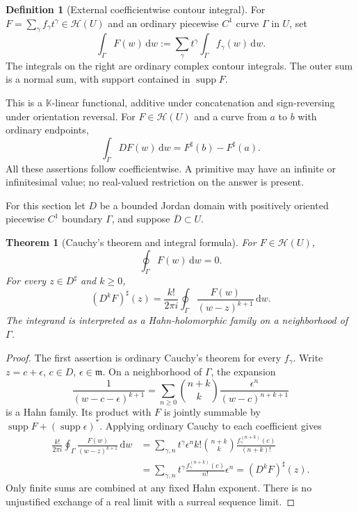 \documentclass[11pt,letterpaper]{article}
\numberwithin{equation}{section}
\newtheorem{theorem}{Theorem}[section]
\theoremstyle{definition}
\newtheorem{definition}[definition]{Definition}
\theoremstyle{remark}
\newcommand{\K}{\mathbb K}
\newcommand{\HH}{\mathscr H}
\newcommand{\mm}{\mathfrak m}
\newcommand{\dd}{\,\mathrm d}
\DeclareMathOperator{\supp}{supp}
\begin{document}
\begin{definition}[External coefficientwise contour integral]\label{def:integral}
For $F=\sum_\gamma f_\gamma t^\gamma\in\HH(U)$ and an ordinary
piecewise $C^1$ curve $\Gamma$ in $U$, set
\begin{equation}\label{eq:integral}
 \int_\Gamma F(w)\dd w
 :=\sum_\gamma t^\gamma\int_\Gamma f_\gamma(w)\dd w.
\end{equation}
The integrals on the right are ordinary complex contour integrals.
The outer sum is a normal sum, with support contained in $\supp F$.
\end{definition}

This is a $\K$-linear functional, additive under concatenation and
sign-reversing under orientation reversal. For $F\in\HH(U)$ and a
curve from $a$ to $b$ with ordinary endpoints,
\[
 \int_\Gamma DF(w)\dd w=F^\sharp(b)-F^\sharp(a).
\]
All these assertions follow coefficientwise. A primitive may have an
infinite or infinitesimal value; no real-valued restriction on the answer
is present.

For this section let $D$ be a bounded Jordan domain with positively oriented
piecewise $C^1$ boundary $\Gamma$, and suppose $\overline D\subset U$.

\begin{theorem}[Cauchy's theorem and integral formula]\label{thm:Cauchy}
For $F\in\HH(U)$,
\[
 \oint_\Gamma F(w)\dd w=0.
\]
For every $z\in D^\sharp$ and $k\ge0$,
\begin{equation}\label{eq:Cauchy}
 (D^kF)^\sharp(z)=\frac{k!}{2\pi i}
       \oint_\Gamma\frac{F(w)}{(w-z)^{k+1}}\dd w.
\end{equation}
The integrand is interpreted as a Hahn-holomorphic family on a
neighborhood of $\Gamma$.
\end{theorem}
\begin{proof}
The first assertion is ordinary Cauchy's theorem for every $f_\gamma$.
Write $z=c+\epsilon$, $c\in D$, $\epsilon\in\mm$. On a neighborhood
of $\Gamma$, the expansion
\[
 \frac1{(w-c-\epsilon)^{k+1}}
 =\sum_{n\ge0}\binom{n+k}{k}
             \frac{\epsilon^n}{(w-c)^{n+k+1}}
\]
is a Hahn family. Its product with $F$ is jointly summable by
$\supp F+(\supp\epsilon)^*$. Applying ordinary Cauchy to each
coefficient gives
\begin{align*}
 \frac{k!}{2\pi i}\oint_\Gamma\frac{F(w)}{(w-z)^{k+1}}\dd w
 &=\sum_{\gamma,n} t^\gamma\epsilon^n
     k!\binom{n+k}{k}\frac{f_\gamma^{(n+k)}(c)}{(n+k)!}\\
 &=\sum_{\gamma,n}t^\gamma\frac{f_\gamma^{(n+k)}(c)}{n!}\epsilon^n
 =(D^kF)^\sharp(z).
\end{align*}
Only finite sums are combined at any fixed Hahn exponent. There is no
unjustified exchange of a real limit with a surreal sequence limit.
\end{proof}
\end{document}
